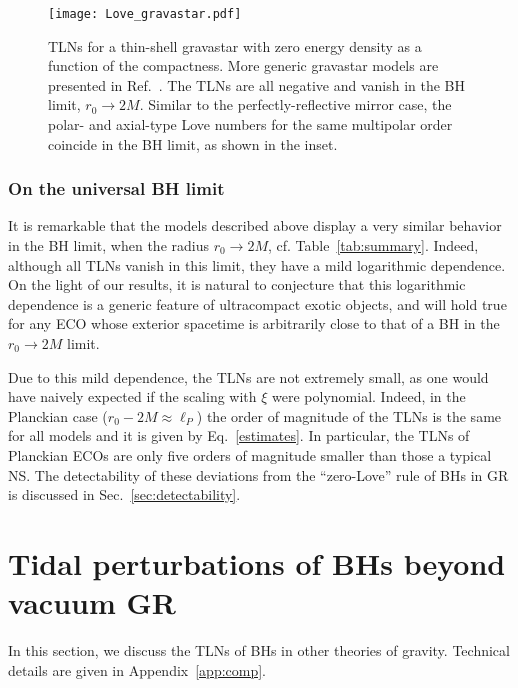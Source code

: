 \documentclass[aps,twocolumn,showpacs,preprintnumbers,nofootinbib,prd,superscriptaddress,groupedaddress,10pt]{revtex4-1}
\begin{document}
\begin{figure}[ht]
\texttt{[image: Love\_gravastar.pdf]}
\caption{TLNs for a thin-shell gravastar with zero energy density as a function of the compactness. More generic gravastar models are presented in Ref.~\cite{Uchikata:2016qku}. The TLNs are all negative and vanish in the BH limit, $r_0\to 2M$. Similar to the perfectly-reflective mirror case, the polar- and axial-type Love numbers for the same multipolar order coincide in the BH limit, as shown in the inset.}\label{fig:kGS}
\end{figure}


\subsubsection{On the universal BH limit}
It is remarkable that the models described above display a very similar behavior in the BH limit, when the radius $r_0\to 2M$, cf. Table~\ref{tab:summary}. Indeed, although all TLNs vanish in this limit, they have a mild logarithmic dependence.
%
On the light of our results, it is natural to conjecture that this logarithmic dependence is a generic feature of ultracompact exotic objects, and will hold true for any ECO whose exterior spacetime is arbitrarily close to that of a BH in the $r_0\to 2M$ limit.

Due to this mild dependence, the TLNs are not extremely small, as one would have naively expected if the scaling with $\xi$ were polynomial. Indeed, in the Planckian case ($r_0-2M\approx \ell_P$) the order of magnitude of the TLNs is the same for all models and it is given by Eq.~\eqref{estimates}. In particular, the TLNs of Planckian ECOs are only five orders of magnitude smaller than those a typical NS.
%
The detectability of these deviations from the ``zero-Love'' rule of BHs in GR is discussed in Sec.~\ref{sec:detectability}.

\section{Tidal perturbations of BHs beyond vacuum GR} \label{sec:BH}
In this section, we discuss the TLNs of BHs in other theories of gravity. Technical details are given in Appendix~\ref{app:comp}.

\end{document}
